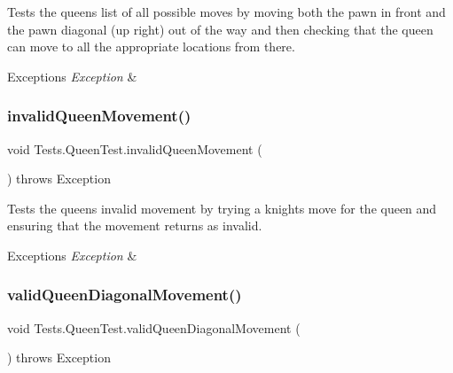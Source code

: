 Tests the queen\textquotesingle{}s list of all possible moves by moving both the pawn in front and the pawn diagonal (up right) out of the way and then checking that the queen can move to all the appropriate locations from there. 
\begin{DoxyExceptions}{Exceptions}
{\em Exception} & \\
\hline
\end{DoxyExceptions}
\hypertarget{class_tests_1_1_queen_test_a0948894af0233e52a11873b7506674bb}{}\label{class_tests_1_1_queen_test_a0948894af0233e52a11873b7506674bb} 
\subsubsection{\texorpdfstring{invalid\+Queen\+Movement()}{invalidQueenMovement()}}
{\footnotesize\ttfamily void Tests.\+Queen\+Test.\+invalid\+Queen\+Movement (\begin{DoxyParamCaption}{ }\end{DoxyParamCaption}) throws Exception}

Tests the queen\textquotesingle{}s invalid movement by trying a knight\textquotesingle{}s move for the queen and ensuring that the movement returns as invalid. 
\begin{DoxyExceptions}{Exceptions}
{\em Exception} & \\
\hline
\end{DoxyExceptions}
\hypertarget{class_tests_1_1_queen_test_ae35369361ac4313f3bf86f111479fa75}{}\label{class_tests_1_1_queen_test_ae35369361ac4313f3bf86f111479fa75} 
\subsubsection{\texorpdfstring{valid\+Queen\+Diagonal\+Movement()}{validQueenDiagonalMovement()}}
{\footnotesize\ttfamily void Tests.\+Queen\+Test.\+valid\+Queen\+Diagonal\+Movement (\begin{DoxyParamCaption}{ }\end{DoxyParamCaption}) throws Exception}

